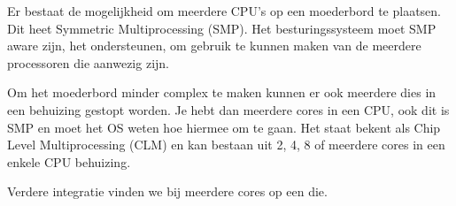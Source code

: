 Er bestaat de mogelijkheid om meerdere CPU's op een moederbord te plaatsen. Dit heet Symmetric Multiprocessing (SMP). Het besturingssysteem moet SMP aware zijn, het ondersteunen, om gebruik te kunnen maken van de meerdere processoren die aanwezig zijn.

Om het moederbord minder complex te maken kunnen er ook meerdere dies in een behuizing gestopt worden. Je hebt dan meerdere cores in een CPU, ook dit is SMP en moet het OS weten hoe hiermee om te gaan. Het staat bekent als Chip Level Multiprocessing (CLM) en kan bestaan uit 2, 4, 8 of meerdere cores in een enkele CPU behuizing.

Verdere integratie vinden we bij meerdere cores op een die.

